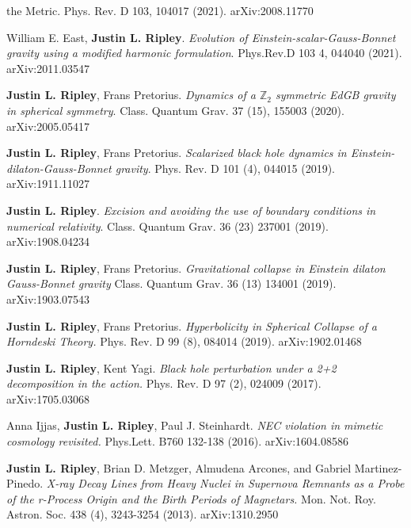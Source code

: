 \documentclass{my_cv}
\begin{document}
\begin{etaremune}
{      the Metric}.
   Phys. Rev. D 103, 104017 (2021).
   arXiv:2008.11770
\item William E. East, {\bf Justin L. Ripley}. 
   \emph{Evolution of Einstein-scalar-Gauss-Bonnet gravity
      using a modified harmonic formulation}.
   Phys.Rev.D 103 4, 044040 (2021).
   arXiv:2011.03547
\item {\bf Justin L. Ripley}, Frans Pretorius. 
   \emph{Dynamics of a $\mathbb{Z}_2$ symmetric EdGB gravity in
      spherical symmetry}.
   Class. Quantum Grav. 37 (15), 155003 (2020).
   arXiv:2005.05417
\item {\bf Justin L. Ripley}, Frans Pretorius. 
   \emph{Scalarized black hole dynamics in
      Einstein-dilaton-Gauss-Bonnet gravity}.
   Phys. Rev. D 101 (4), 044015 (2019).
   arXiv:1911.11027
\item {\bf Justin L. Ripley}. 
   \emph{Excision and avoiding the use of boundary conditions
      in numerical relativity}.
   Class. Quantum Grav. 36 (23) 237001 (2019).  
   arXiv:1908.04234
\item {\bf Justin L. Ripley}, Frans Pretorius. 
   \emph{Gravitational collapse in Einstein
      dilaton Gauss-Bonnet gravity}
   Class. Quantum Grav. 36 (13) 134001 (2019).
   arXiv:1903.07543
\item {\bf Justin L. Ripley}, Frans Pretorius. 
   \emph{Hyperbolicity in Spherical Collapse of a Horndeski Theory.}
   Phys. Rev. D 99 (8), 084014 (2019).
   arXiv:1902.01468
\item {\bf Justin L. Ripley}, Kent Yagi. 
   \emph{Black hole perturbation under a 2+2 decomposition
      in the action.}
   Phys. Rev. D 97 (2), 024009 (2017).
   arXiv:1705.03068
\item Anna Ijjas, {\bf Justin L. Ripley}, Paul J. Steinhardt.
   \emph{NEC violation in mimetic cosmology revisited.}
   Phys.Lett. B760 132-138 (2016).
   arXiv:1604.08586
\item {\bf Justin L. Ripley}, Brian D. Metzger,	
      Almudena Arcones, and Gabriel Martinez-Pinedo.
   \emph{X-ray Decay Lines from Heavy Nuclei in
      Supernova Remnants as a Probe of the r-Process Origin
      and the Birth Periods of Magnetars.}
   Mon. Not. Roy. Astron. Soc. 438 (4), 3243-3254 (2013).
   arXiv:1310.2950
\end{etaremune}
\end{document}
